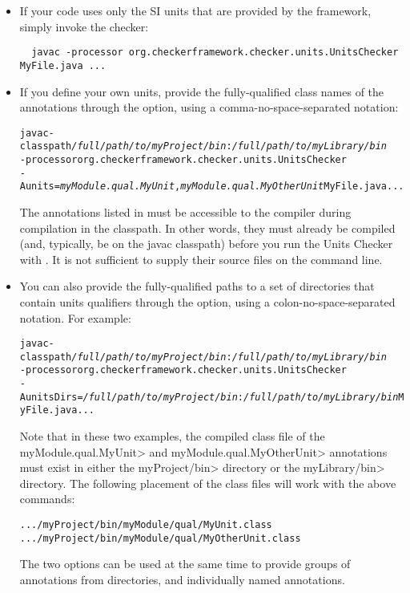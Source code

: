 \begin{itemize}
\item
If your code uses only the SI units that are provided by the
framework, simply invoke the checker:

\begin{Verbatim}
  javac -processor org.checkerframework.checker.units.UnitsChecker MyFile.java ...
\end{Verbatim}

\item
If you define your own units, provide the fully-qualified class names of the
annotations through the  option, using a comma-no-space-separated
notation:

\begin{alltt}
  javac -classpath \textit{/full/path/to/myProject/bin}:\textit{/full/path/to/myLibrary/bin} \ttbs
        -processor org.checkerframework.checker.units.UnitsChecker \ttbs
        -Aunits=\textit{myModule.qual.MyUnit},\textit{myModule.qual.MyOtherUnit} MyFile.java ...
\end{alltt}

The annotations listed in  must be accessible to
the compiler during compilation in the classpath.  In other words, they must
already be compiled (and, typically, be on the javac classpath)
before you run the Units Checker with .  It
is not sufficient to supply their source files on the command line.

\item
You can also provide the fully-qualified paths to a set of directories
that contain units qualifiers through the  option,
using a colon-no-space-separated notation. For example:

\begin{alltt}
  javac -classpath \textit{/full/path/to/myProject/bin}:\textit{/full/path/to/myLibrary/bin} \ttbs
        -processor org.checkerframework.checker.units.UnitsChecker \ttbs
        -AunitsDirs=\textit{/full/path/to/myProject/bin}:\textit{/full/path/to/myLibrary/bin} MyFile.java ...
\end{alltt}

Note that in these two examples, the compiled class file of the
\<myModule.qual.MyUnit> and \<myModule.qual.MyOtherUnit> annotations
must exist in either the \<myProject/bin> directory or the
\<myLibrary/bin> directory. The following placement of the class files
will work with the above commands:

\begin{alltt}
  .../myProject/bin/myModule/qual/MyUnit.class
  .../myProject/bin/myModule/qual/MyOtherUnit.class
\end{alltt}

The two options can be used at the same time to provide groups of annotations
from directories, and individually named annotations.

\end{itemize}


